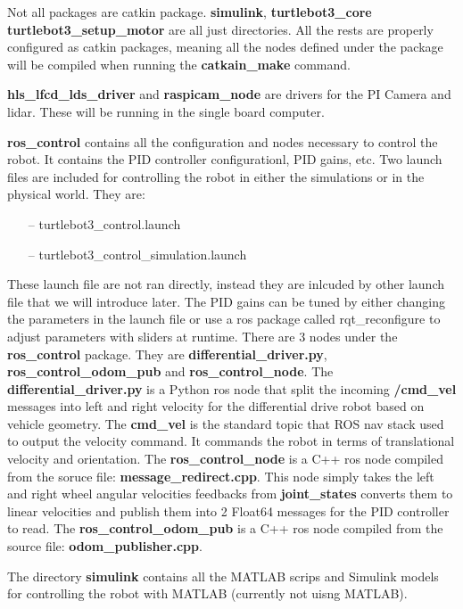 \documentclass[12]{article}
\begin{document}
Not all packages are catkin package. \textbf{simulink}, \textbf{turtlebot3\_core} \textbf{turtlebot3\_setup\_motor} are all just directories. 
All the rests are properly configured as catkin packages, meaning all the nodes defined under the package will be compiled when running the \textbf{catkain\_make} command. 

\textbf{hls\_lfcd\_lds\_driver} and \textbf{raspicam\_node} are drivers for the PI Camera and lidar. 
These will be running in the single board computer. 

\textbf{ros\_control} contains all the configuration and nodes necessary to control the robot. 
It contains the PID controller configurationl, PID gains, etc.
Two launch files are included for controlling the robot in either the simulations or in the physical world. They are:

\begin{itemize}
	\item[--] turtlebot3\_control.launch
	\item[--] turtlebot3\_control\_simulation.launch
\end{itemize}  
These launch file are not ran directly, instead they are inlcuded by other launch file that we will introduce later.
The PID gains can be tuned by either changing the parameters in the launch file or use a ros package called rqt\_reconfigure to adjust parameters with sliders at runtime. 
There are 3 nodes under the \textbf{ros\_control} package. They are \textbf{differential\_driver.py}, \textbf{ros\_control\_odom\_pub} and \textbf{ros\_control\_node}. 
The \textbf{differential\_driver.py} is a Python ros node that split the incoming \textbf{\//cmd\_vel} messages into left and right velocity for the differential drive robot based on vehicle geometry. 
The \textbf{\/cmd\_vel} is the standard topic that ROS nav stack used to output the velocity command. It commands the robot in terms of translational velocity and orientation. 
The \textbf{ros\_control\_node} is a C++ ros node compiled from the soruce file: \textbf{message\_redirect.cpp}. 
This node simply takes the left and right wheel angular velocities feedbacks from \textbf{\/joint\_states} converts them to linear velocities and publish them into 2 Float64 messages for the PID controller to read.
The \textbf{ros\_control\_odom\_pub} is a C++ ros node compiled from the source file: \textbf{odom\_publisher.cpp}.

The directory \textbf{simulink} contains all the MATLAB scrips and Simulink models for controlling the robot with MATLAB (currently not uisng MATLAB). 
\end{document}
